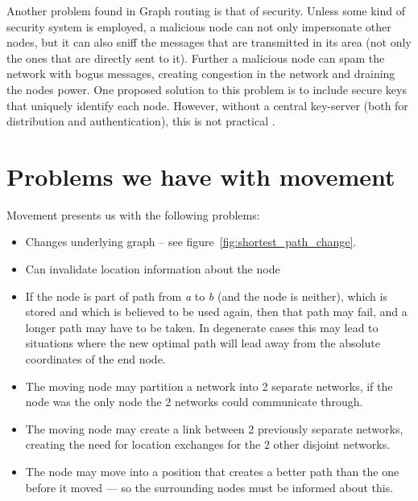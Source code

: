 Another problem found in Graph routing is that of security. Unless some kind of security system is employed, a malicious node can not only impersonate other nodes, but it can also sniff the messages that are transmitted in its area (not only the ones that are directly sent to it). Further a malicious node can spam the network with bogus messages, creating congestion in the network and draining the nodes power. One proposed solution to this problem is to include secure keys that uniquely identify each node. However, without a central key-server (both for distribution and authentication), this is not practical .

\section{Problems we have with movement}

Movement presents us with the following problems:


\begin{itemize}
\item Changes underlying graph -- see figure~\ref{fig:shortest_path_change}.
\item Can invalidate location information about the node 
\item If the node is part of path from \emph{a} to \emph{b} (and the node is neither), which is stored and which is believed to be used again, then that path may fail, and a longer path may have to be taken. In degenerate cases this may lead to situations where the new optimal path will lead away from the absolute coordinates of the end node.
\item The moving node may partition a network into 2 separate networks, if the node was the only node the 2 networks could communicate through.
\item The moving node may create a link between 2 previously separate networks, creating the need for location exchanges for the 2 other disjoint networks.
\item The node may move into a position that creates a better path than the one before it moved --- so the surrounding nodes must be informed about this.
\end{itemize}

